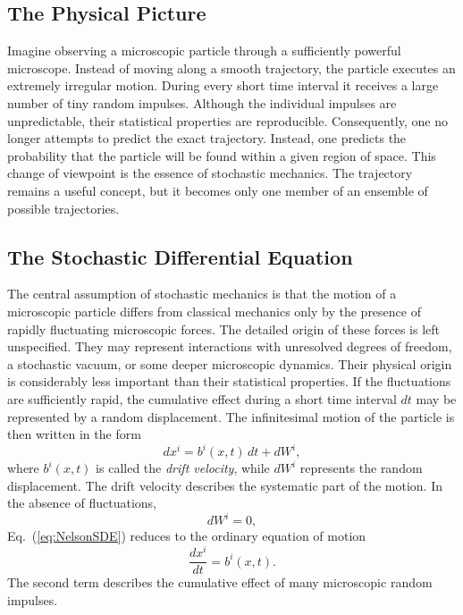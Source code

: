\subsection{The Physical Picture}
Imagine observing a microscopic particle through a sufficiently powerful
microscope.
Instead of moving along a smooth trajectory, the particle executes an
extremely irregular motion. During every short time interval it receives
a large number of tiny random impulses.
Although the individual impulses are unpredictable, their statistical
properties are reproducible.
Consequently, one no longer attempts to predict the exact trajectory.
Instead, one predicts the probability that the particle will be found
within a given region of space.
This change of viewpoint is the essence of stochastic mechanics.
The trajectory remains a useful concept, but it becomes only one member
of an ensemble of possible trajectories.
\subsection{The Stochastic Differential Equation}
The central assumption of stochastic mechanics is that the motion of a
microscopic particle differs from classical mechanics only by the
presence of rapidly fluctuating microscopic forces. The detailed origin
of these forces is left unspecified. They may represent interactions
with unresolved degrees of freedom, a stochastic vacuum, or some deeper
microscopic dynamics. Their physical origin is considerably less
important than their statistical properties.
If the fluctuations are sufficiently rapid, the cumulative effect during
a short time interval $dt$ may be represented by a random displacement.
The infinitesimal motion of the particle is then written in the form
\begin{equation}
dx^i=b^i(x,t)\,dt+dW^i ,
\label{eq:NelsonSDE}
\end{equation}
where $b^i(x,t)$ is called the \emph{drift velocity}, while $dW^i$
represents the random displacement.
The drift velocity describes the systematic part of the motion.
In the absence of fluctuations,
\[dW^i=0,\]
Eq.~(\ref{eq:NelsonSDE}) reduces to the ordinary equation of motion
\[\frac{dx^i}{dt}=b^i(x,t).\]
The second term describes the cumulative effect of many microscopic
random impulses.


